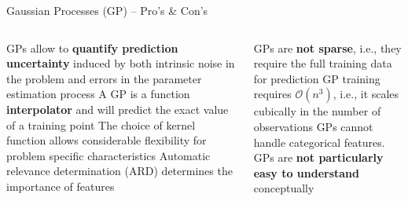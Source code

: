 \begin{frame}{Gaussian Processes (GP) -- Pro's \& Con's}

\begin{columns}[onlytextwidth]
  \begin{column}{0.5\textwidth}
    \footnotesize
    \begin{itemize}
      \positem GPs allow to \textbf{quantify prediction uncertainty} induced by both intrinsic noise in the problem and errors in the parameter estimation process
      \positem A GP is a function \textbf{interpolator} and will predict the exact value of a training point
      \positem The choice of kernel function allows considerable flexibility for problem specific characteristics
      \positem Automatic relevance determination (ARD) determines the importance of features
    \end{itemize}
  \end{column}
  \begin{column}{0.5\textwidth}
    \footnotesize
    \begin{itemize}
      \negitem GPs are \textbf{not sparse}, i.e., they require the full training data for prediction
      \negitem GP training requires $\mathcal{O}(n^3)$, i.e., it scales cubically in the number of observations
      \negitem GPs cannot handle categorical features.
      \negitem GPs are \textbf{not particularly easy to understand} conceptually
    \end{itemize}
  \end{column}
\end{columns}

\vfill

\small


\end{frame}


